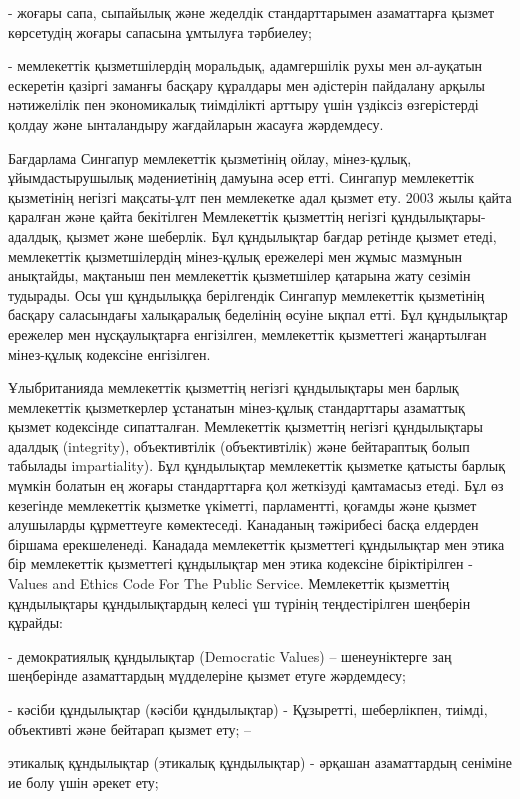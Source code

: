 - жоғары сапа, сыпайылық және жеделдік стандарттарымен азаматтарға
қызмет көрсетудің жоғары сапасына ұмтылуға тәрбиелеу;

- мемлекеттік қызметшілердің моральдық, адамгершілік рухы мен әл-ауқатын
ескеретін қазіргі заманғы басқару құралдары мен әдістерін пайдалану
арқылы нәтижелілік пен экономикалық тиімділікті арттыру үшін үздіксіз
өзгерістерді қолдау және ынталандыру жағдайларын жасауға жәрдемдесу.

Бағдарлама Сингапур мемлекеттік қызметінің ойлау, мінез-құлық,
ұйымдастырушылық мәдениетінің дамуына әсер етті. Сингапур мемлекеттік
қызметінің негізгі мақсаты-ұлт пен мемлекетке адал қызмет ету. 2003 жылы
қайта қаралған және қайта бекітілген Мемлекеттік қызметтің негізгі
құндылықтары-адалдық, қызмет және шеберлік. Бұл құндылықтар бағдар
ретінде қызмет етеді, мемлекеттік қызметшілердің мінез-құлық ережелері
мен жұмыс мазмұнын анықтайды, мақтаныш пен мемлекеттік қызметшілер
қатарына жату сезімін тудырады. Осы үш құндылыққа берілгендік Сингапур
мемлекеттік қызметінің басқару саласындағы халықаралық беделінің өсуіне
ықпал етті. Бұл құндылықтар ережелер мен нұсқаулықтарға енгізілген,
мемлекеттік қызметтегі жаңартылған мінез-құлық кодексіне енгізілген.

Ұлыбританияда мемлекеттік қызметтің негізгі құндылықтары мен барлық
мемлекеттік қызметкерлер ұстанатын мінез-құлық стандарттары азаматтық
қызмет кодексінде сипатталған. Мемлекеттік қызметтің негізгі
құндылықтары адалдық (integrity), объективтілік (объективтілік) және
бейтараптық болып табылады impartiality). Бұл құндылықтар мемлекеттік
қызметке қатысты барлық мүмкін болатын ең жоғары стандарттарға қол
жеткізуді қамтамасыз етеді. Бұл өз кезегінде мемлекеттік қызметке
үкіметті, парламентті, қоғамды және қызмет алушыларды құрметтеуге
көмектеседі. Канаданың тәжірибесі басқа елдерден біршама ерекшеленеді.
Канадада мемлекеттік қызметтегі құндылықтар мен этика бір мемлекеттік
қызметтегі құндылықтар мен этика кодексіне біріктірілген - Values and
Ethics Code For The Public Service. Мемлекеттік қызметтің құндылықтары
құндылықтардың келесі үш түрінің теңдестірілген шеңберін құрайды:

- демократиялық құндылықтар (Democratic Values) -- шенеуніктерге заң
шеңберінде азаматтардың мүдделеріне қызмет етуге жәрдемдесу;

- кәсіби құндылықтар (кәсіби құндылықтар) - Құзыретті, шеберлікпен,
тиімді, объективті және бейтарап қызмет ету; --

этикалық құндылықтар (этикалық құндылықтар) - әрқашан азаматтардың
сеніміне ие болу үшін әрекет ету;

